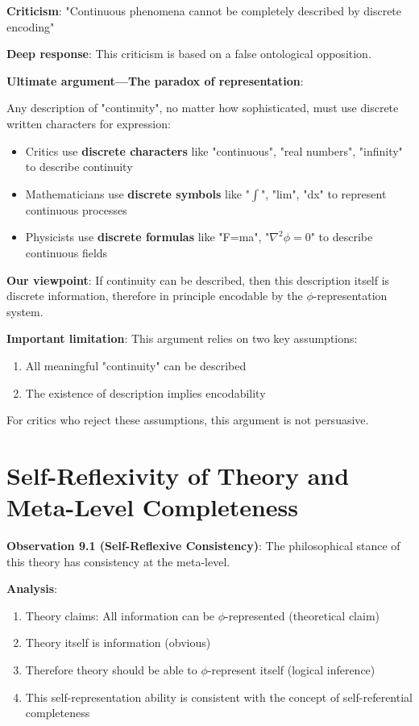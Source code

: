 \textbf{Criticism}: "Continuous phenomena cannot be completely described by discrete encoding"

\textbf{Deep response}: This criticism is based on a false ontological opposition.

\textbf{Ultimate argument---The paradox of representation}:

Any description of "continuity", no matter how sophisticated, must use discrete written characters for expression:

\begin{itemize}
\item Critics use \textbf{discrete characters} like "continuous", "real numbers", "infinity" to describe continuity
\item Mathematicians use \textbf{discrete symbols} like "$\int$", "lim", "dx" to represent continuous processes
\item Physicists use \textbf{discrete formulas} like "F=ma", "$\nabla^2\phi=0$" to describe continuous fields
\end{itemize}

\textbf{Our viewpoint}: If continuity can be described, then this description itself is discrete information, therefore in principle encodable by the $\phi$-representation system.

\textbf{Important limitation}: This argument relies on two key assumptions:
\begin{enumerate}
\item All meaningful "continuity" can be described
\item The existence of description implies encodability
\end{enumerate}

For critics who reject these assumptions, this argument is not persuasive.

\section{Self-Reflexivity of Theory and Meta-Level Completeness}
\label{sec:ch09_defense:self-reflexivity-of-theory-and-meta-level-completeness}

\textbf{Observation 9.1 (Self-Reflexive Consistency)}: The philosophical stance of this theory has consistency at the meta-level.
\label{thm:7.1}

\textbf{Analysis}:
\begin{enumerate}
\item Theory claims: All information can be $\phi$-represented (theoretical claim)
\item Theory itself is information (obvious)
\item Therefore theory should be able to $\phi$-represent itself (logical inference)
\item This self-representation ability is consistent with the concept of self-referential completeness
\end{enumerate}

